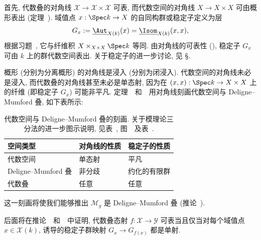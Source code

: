 首先, 代数叠的对角线 $\mathcal X\to\mathcal X\times\mathcal X$ 可表, 而代数空间的对角线 $X\to X\times X$ 可由概形表出 (定理~).
域值点 $x:\Spec k\to\mathcal X$ 的自同构群或稳定子定义为层
\[
G_x:=\underline{\Aut}_{\mathcal X(k)}(x)=\underline{\Isom}_{\mathcal X(k)}(x,x),
\]
根据习题~, 它与纤维积 $\mathcal X\times_{\mathcal X\times\mathcal X}\Spec k$ 等同.
由对角线的可表性 (), 稳定子 $G_x$ 可由 $k$ 上的群代数空间表出. 关于稳定子的进一步讨论, 见 \S{}.

概形 (分别为分离概形) 的对角线是浸入 (分别为闭浸入).
代数空间的对角线未必是浸入, 而代数叠的对角线甚至未必是单态射, 因为在 $(x,x):\Spec k\to\mathcal X\times\mathcal X$ 上的纤维 (即稳定子 $G_x$) 可能非平凡.
定理~~和~~用对角线刻画代数空间与 Deligne--Mumford 叠, 如下表所示:
\begin{table}[H]
\centering
\begin{tabularx}{\textwidth}{*{3}{X}}
\toprule
空间类型&对角线的性质&稳定子的性质\\
\midrule
代数空间&单态射&平凡\\
Deligne--Mumford 叠&非分歧&约化的有限群\footnotemark\\
代数叠&任意&任意\\
\bottomrule
\end{tabularx}
\caption{代数空间与 Deligne--Mumford 叠的刻画. 关于模理论三分法的进一步图示说明, 见表~, 图~~及表~.}\label{src:4.1.33}
\end{table}
这一刻画将使我们能够推出 $\mathcal M_g$ 是 Deligne--Mumford 叠 (推论~).

后面将在推论~~和~~中证明, 代数叠态射 $f:\mathcal X\to\mathcal Y$ 可表当且仅当对每个域值点 $x\in\mathcal X(k)$, 诱导的稳定子群映射 $G_x\to G_{f(x)}$ 都是单射.

